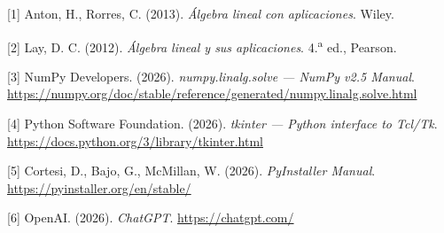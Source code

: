 \documentclass[11pt,a4paper]{article}
\begin{document}
[1] Anton, H., Rorres, C. (2013). \textit{Álgebra lineal con aplicaciones}. Wiley.

[2] Lay, D. C. (2012). \textit{Álgebra lineal y sus aplicaciones}. 4.\textsuperscript{a} ed., Pearson.

[3] NumPy Developers. (2026). \textit{numpy.linalg.solve — NumPy v2.5 Manual}. \url{https://numpy.org/doc/stable/reference/generated/numpy.linalg.solve.html}

[4] Python Software Foundation. (2026). \textit{tkinter — Python interface to Tcl/Tk}. \url{https://docs.python.org/3/library/tkinter.html}

[5] Cortesi, D., Bajo, G., McMillan, W. (2026). \textit{PyInstaller Manual}. \url{https://pyinstaller.org/en/stable/}

[6] OpenAI. (2026). \textit{ChatGPT}. \url{https://chatgpt.com/}
\end{document}
